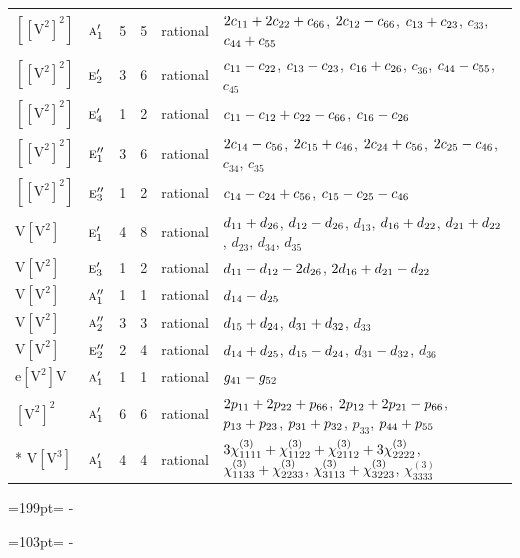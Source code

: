 \documentclass[10pt,a4paper]{article}
\newcommand{\needspace}[1]{\par\penalty-100\begingroup\dimen0=#1\relax\dimen2=\pagegoal
  \advance\dimen2-\pagetotal\ifdim\dimen0>\dimen2\relax\ifdim\dimen2>0pt\vfil\break\fi\fi
  \endgroup}
\numberwithin{equation}{section}
\newcommand{\irr}[1]{\text{\normalfont\scshape #1}}
\newcommand{\jahn}[1]{\mathrm{#1}}
\newlength{\fillwidth}\newlength{\cellwidth}\newlength{\colwidth}
\newcommand{\signbreak}{\penalty100\relax}
\begin{document}
{\begin{longtable}{@{}llrrl>{\RaggedRight\arraybackslash}p{\fillwidth}@{}}
$\jahn{[[V^{2}]^{2}]}$ & $\irr{a}_{1}'$ & 5 & 5 & rational & $2c_{11} +\signbreak 2c_{22} +\signbreak c_{66}$, $2c_{12} -\signbreak c_{66}$, $c_{13} +\signbreak c_{23}$, $c_{33}$, $c_{44} +\signbreak c_{55}$\\
$\jahn{[[V^{2}]^{2}]}$ & $\irr{e}_{2}'$ & 3 & 6 & rational & $c_{11} -\signbreak c_{22}$, $c_{13} -\signbreak c_{23}$, $c_{16} +\signbreak c_{26}$, $c_{36}$, $c_{44} -\signbreak c_{55}$, $c_{45}$\\
$\jahn{[[V^{2}]^{2}]}$ & $\irr{e}_{4}'$ & 1 & 2 & rational & $c_{11} -\signbreak c_{12} +\signbreak c_{22} -\signbreak c_{66}$, $c_{16} -\signbreak c_{26}$\\
$\jahn{[[V^{2}]^{2}]}$ & $\irr{e}_{1}''$ & 3 & 6 & rational & $2c_{14} -\signbreak c_{56}$, $2c_{15} +\signbreak c_{46}$, $2c_{24} +\signbreak c_{56}$, $2c_{25} -\signbreak c_{46}$, $c_{34}$, $c_{35}$\\
$\jahn{[[V^{2}]^{2}]}$ & $\irr{e}_{3}''$ & 1 & 2 & rational & $c_{14} -\signbreak c_{24} +\signbreak c_{56}$, $c_{15} -\signbreak c_{25} -\signbreak c_{46}$\\
$\jahn{V[V^{2}]}$ & $\irr{e}_{1}'$ & 4 & 8 & rational & $d_{11} +\signbreak d_{26}$, $d_{12} -\signbreak d_{26}$, $d_{13}$, $d_{16} +\signbreak d_{22}$, $d_{21} +\signbreak d_{22}$, $d_{23}$, $d_{34}$, $d_{35}$\\
$\jahn{V[V^{2}]}$ & $\irr{e}_{3}'$ & 1 & 2 & rational & $d_{11} -\signbreak d_{12} -\signbreak 2d_{26}$, $2d_{16} +\signbreak d_{21} -\signbreak d_{22}$\\
$\jahn{V[V^{2}]}$ & $\irr{a}_{1}''$ & 1 & 1 & rational & $d_{14} -\signbreak d_{25}$\\
$\jahn{V[V^{2}]}$ & $\irr{a}_{2}''$ & 3 & 3 & rational & $d_{15} +\signbreak d_{24}$, $d_{31} +\signbreak d_{32}$, $d_{33}$\\
$\jahn{V[V^{2}]}$ & $\irr{e}_{2}''$ & 2 & 4 & rational & $d_{14} +\signbreak d_{25}$, $d_{15} -\signbreak d_{24}$, $d_{31} -\signbreak d_{32}$, $d_{36}$\\
$\jahn{e[V^{2}]V}$ & $\irr{a}_{1}'$ & 1 & 1 & rational & $\mathnormal{g}_{41} -\signbreak \mathnormal{g}_{52}$\\
$\jahn{[V^{2}]^{2}}$ & $\irr{a}_{1}'$ & 6 & 6 & rational & $2p_{11} +\signbreak 2p_{22} +\signbreak p_{66}$, $2p_{12} +\signbreak 2p_{21} -\signbreak p_{66}$, $p_{13} +\signbreak p_{23}$, $p_{31} +\signbreak p_{32}$, $p_{33}$, $p_{44} +\signbreak p_{55}$\\*
$\jahn{V[V^{3}]}$ & $\irr{a}_{1}'$ & 4 & 4 & rational & $3\chi^{(3)}_{1111} +\signbreak \chi^{(3)}_{1122} +\signbreak \chi^{(3)}_{2112} +\signbreak 3\chi^{(3)}_{2222}$, $\chi^{(3)}_{1133} +\signbreak \chi^{(3)}_{2233}$, $\chi^{(3)}_{3113} +\signbreak \chi^{(3)}_{3223}$, $\chi^{(3)}_{3333}$\\
\bottomrule\end{longtable}}
\needspace{199pt}
\needspace{103pt}
\end{document}
